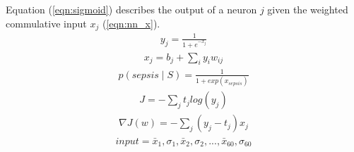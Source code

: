 \documentclass[12pt,solutions]{article}
\begin{document}
Equation (\ref{eqn:sigmoid}) describes
the output of a neuron $j$ given the weighted commulative input $x_j$ (\ref{eqn:nn_x}). 
\begin{align}
y_{j} = \frac{1}{1+e^{-x_{j}}}
\label{eqn:sigmoid}
\end{align}
\begin{align}
x_{j} = b_{j} + \sum_{i}y_{i}w_{ij}
\label{eqn:nn_x}
\end{align}
\begin{align}
p(sepsis \mid S) = \frac{1}{1 + exp(x_{sepsis})}
\label{eqn:nn_prob}
\end{align}
\begin{align}
J = -\sum_{j} t_{j} log(y_{j})
\label{eqn:nn_J}
\end{align}
\begin{align}
\nabla J(w) = -\sum_{j} (y_{j} - t_{j}) x_{j}
\label{eqn:nn_dJ}
\end{align}
\begin{align}
input = \bar{x}_{1}, \sigma_{1}, \bar{x}_{2}, \sigma_{2}, ... ,\bar{x}_{60}, \sigma_{60}
\label{eqn:nn_input}
\end{align}
\end{document}
